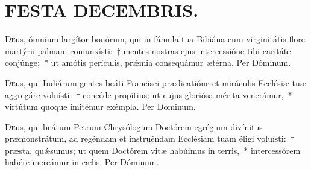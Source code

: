 \documentclass[vesperale_romanum.tex]{subfiles}
\begin{document}
\newpage
\thispagestyle{empty}
\section[Festa Decembris.]{FESTA DECEMBRIS.}


\semiduplex

\oratio

\lettrine{D}{e}us, ó\-mnium largítor bonórum, qui in fámula tua Bibiána cum virginitátis flore martýrii palmam coniunxísti:~† mentes nostras ejus intercessióne tibi caritáte conjúnge;~* ut amótis perículis, prǽmia consequámur ætérna.
Per Dóminum.



\myrule



\duplexmajus

\oratio

\lettrine{D}{e}us, qui Indiárum gentes beáti Francísci prædicatióne et miráculis Ecclésiæ tuæ aggregáre voluísti:~† concéde propítius; ut cujus gloriósa mérita venerámur,~* virtútum quoque imitémur exémpla. Per Dóminum.



\myrule


\duplexmtv


\oratio

\lettrine{D}{e}us, qui beátum Petrum Chrysólogum Do\-ctórem egrégium divínitus præmonstrátum, ad regéndam et instruéndam Ecclésiam tuam éligi voluísti:~† præsta, quǽsumus; ut quem Do\-ctórem vitæ habúimus in terris,~* intercessórem habére mereámur in cælis. Per Dóminum.
\end{document}
